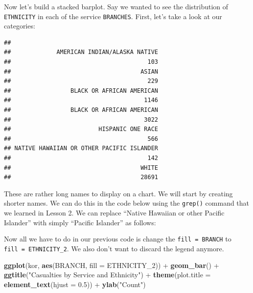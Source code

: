 \documentclass[]{book}
\newenvironment{Shaded}{\begin{snugshade}}{\end{snugshade}}
\newcommand{\KeywordTok}[1]{\textcolor[rgb]{0.13,0.29,0.53}{\textbf{{#1}}}}
\newcommand{\DataTypeTok}[1]{\textcolor[rgb]{0.13,0.29,0.53}{{#1}}}
\newcommand{\FloatTok}[1]{\textcolor[rgb]{0.00,0.00,0.81}{{#1}}}
\newcommand{\StringTok}[1]{\textcolor[rgb]{0.31,0.60,0.02}{{#1}}}
\newcommand{\NormalTok}[1]{{#1}}
\begin{document}
Now let's build a stacked barplot. Say we wanted to see the distribution
of \texttt{ETHNICITY} in each of the service \texttt{BRANCHES}. First,
let's take a look at our categories:

\begin{Shaded}
\end{Shaded}

\begin{verbatim}
## 
##             AMERICAN INDIAN/ALASKA NATIVE 
##                                       103 
##                                     ASIAN 
##                                       229 
##                 BLACK OR AFRICAN AMERICAN 
##                                      1146 
##                 BLACK OR AFRICAN AMERICAN 
##                                      3022 
##                         HISPANIC ONE RACE 
##                                       566 
## NATIVE HAWAIIAN OR OTHER PACIFIC ISLANDER 
##                                       142 
##                                     WHITE 
##                                     28691
\end{verbatim}

These are rather long names to display on a chart. We will start by
creating shorter names. We can do this in the code below using the
\texttt{grep()} command that we learned in Lesson 2. We can replace
``Native Hawaiian or other Pacific Islander'' with simply ``Pacific
Islander'' as follows:

\begin{Shaded}
\end{Shaded}

Now all we have to do in our previous code is change the
\texttt{fill\ =\ BRANCH} to \texttt{fill\ =\ ETHNICITY\_2}. We also
don't want to discard the legend anymore.

\begin{Shaded}
\begin{Highlighting}[]
\KeywordTok{ggplot}\NormalTok{(kor, }\KeywordTok{aes}\NormalTok{(BRANCH, }\DataTypeTok{fill =} \NormalTok{ETHNICITY_2)) +}\StringTok{ }\KeywordTok{geom_bar}\NormalTok{() +}\StringTok{ }
\StringTok{  }\KeywordTok{ggtitle}\NormalTok{(}\StringTok{"Casualties by Service and Ethnicity"}\NormalTok{) +}\StringTok{ }
\StringTok{  }\KeywordTok{theme}\NormalTok{(}\DataTypeTok{plot.title =} \KeywordTok{element_text}\NormalTok{(}\DataTypeTok{hjust =} \FloatTok{0.5}\NormalTok{)) +}\StringTok{ }\KeywordTok{ylab}\NormalTok{(}\StringTok{"Count"}\NormalTok{)}
\end{Highlighting}
\end{Shaded}
\end{document}
